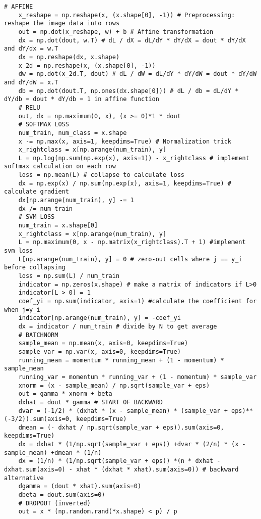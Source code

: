 \documentclass[9pt]{extarticle}
\begin{document}
\begin{lstlisting}[multicols=2]
    # AFFINE
    x_reshape = np.reshape(x, (x.shape[0], -1)) # Preprocessing: reshape the image data into rows
    out = np.dot(x_reshape, w) + b # Affine transformation
    dx = np.dot(dout, w.T) # dL / dX = dL/dY * dY/dX = dout * dY/dX and dY/dx = w.T
    dx = np.reshape(dx, x.shape)
    x_2d = np.reshape(x, (x.shape[0], -1)) 
    dw = np.dot(x_2d.T, dout) # dL / dW = dL/dY * dY/dW = dout * dY/dW and dY/dW = x.T
    db = np.dot(dout.T, np.ones(dx.shape[0])) # dL / db = dL/dY * dY/db = dout * dY/db = 1 in affine function
    # RELU
    out, dx = np.maximum(0, x), (x >= 0)*1 * dout
    # SOFTMAX LOSS
    num_train, num_class = x.shape
    x -= np.max(x, axis=1, keepdims=True) # Normalization trick
    x_rightclass = x[np.arange(num_train), y] 
    L = np.log(np.sum(np.exp(x), axis=1)) - x_rightclass # implement softmax calculation on each row
    loss = np.mean(L) # collapse to calculate loss
    dx = np.exp(x) / np.sum(np.exp(x), axis=1, keepdims=True) # calculate gradient
    dx[np.arange(num_train), y] -= 1
    dx /= num_train
    # SVM LOSS
    num_train = x.shape[0]
    x_rightclass = x[np.arange(num_train), y]
    L = np.maximum(0, x - np.matrix(x_rightclass).T + 1) #implement svm loss
    L[np.arange(num_train), y] = 0 # zero-out cells where j == y_i before collapsing
    loss = np.sum(L) / num_train
    indicator = np.zeros(x.shape) # make a matrix of indicators if L>0 
    indicator[L > 0] = 1
    coef_yi = np.sum(indicator, axis=1) #calculate the coefficient for when j=y_i
    indicator[np.arange(num_train), y] = -coef_yi
    dx = indicator / num_train # divide by N to get average
    # BATCHNORM
    sample_mean = np.mean(x, axis=0, keepdims=True)
    sample_var = np.var(x, axis=0, keepdims=True)
    running_mean = momentum * running_mean + (1 - momentum) * sample_mean
    running_var = momentum * running_var + (1 - momentum) * sample_var
    xnorm = (x - sample_mean) / np.sqrt(sample_var + eps)
    out = gamma * xnorm + beta
    dxhat = dout * gamma # START OF BACKWARD
    dvar = (-1/2) * (dxhat * (x - sample_mean) * (sample_var + eps)**(-3/2)).sum(axis=0, keepdims=True)
    dmean = (- dxhat / np.sqrt(sample_var + eps)).sum(axis=0, keepdims=True)
    dx = dxhat * (1/np.sqrt(sample_var + eps)) +dvar * (2/n) * (x - sample_mean) +dmean * (1/n)
    dx = (1/n) * (1/np.sqrt(sample_var + eps)) *(n * dxhat - dxhat.sum(axis=0) - xhat * (dxhat * xhat).sum(axis=0)) # backward alternative
    dgamma = (dout * xhat).sum(axis=0)
    dbeta = dout.sum(axis=0)
    # DROPOUT (inverted)
    out = x * (np.random.rand(*x.shape) < p) / p

\end{lstlisting}
\end{document}
